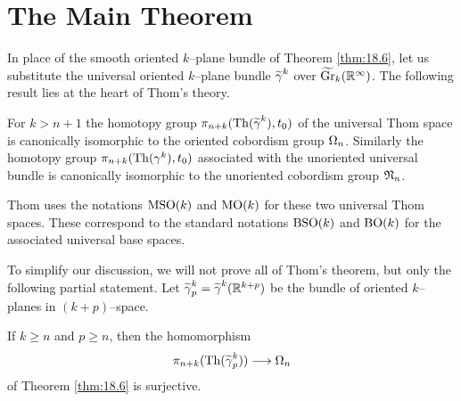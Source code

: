 \documentclass[../main]{subfiles}
\begin{document}
\section{The Main Theorem}
In place of the smooth oriented $k$--plane bundle of Theorem \ref{thm:18.6}, let us substitute the universal oriented $k$--plane bundle ${\xtilde\tautological}^k$ over ${\xtilde\grassmannian}_k({\mathbb R}^\infty)$. The following result lies at the heart of Thom's theory. 
\begin{theorem*}[Thom]
For $k > n + 1$ the homotopy group $\pi_{n + k}(\thom({\xtilde\tautological}^k), t_0)$ of the universal Thom space is canonically isomorphic to the oriented cobordism group $\Omega_n$. Similarly the homotopy group $\pi_{n + k}(\operatorname{Th}(\gamma^k), t_0)$ associated with the unoriented universal bundle is canonically isomorphic to the unoriented cobordism group ${\mathfrak{N}}_n$. 
\end{theorem*}

\begin{remark*}
Thom uses the notations $\operatorname{MSO}(k)$ and $\operatorname{MO}(k)$ for these two universal Thom spaces. These correspond to the standard notations $\operatorname{BSO}(k)$ and $\operatorname{BO}(k)$ for the associated universal base spaces. 
\end{remark*} 

To simplify our discussion, we will not prove all of Thom's theorem, but only the following partial statement. Let ${\xtilde\tautological}_p^k = {\xtilde\tautological}^k({\mathbb R}^{k + p})$ be the bundle of oriented $k$--planes in $(k + p)$--space. 

\begin{lemma}
\label{lem:18.7}
If $k \ge n$ and $p \ge n$, then the homomorphism \[\pi_{n + k}(\thom({\xtilde\tautological}_p^k)) \longrightarrow \orientedCobordism_n\] of Theorem \ref{thm:18.6} is surjective. 
\end{lemma}
\end{document}
